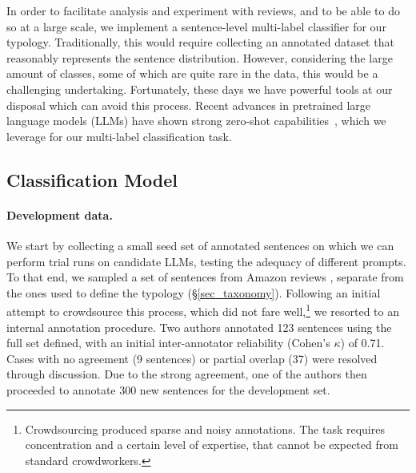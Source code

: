 In order to facilitate analysis and experiment with reviews, and to be able to do so at a large scale, we implement a sentence-level multi-label classifier for our typology.
Traditionally, this would require collecting an annotated dataset that reasonably represents the sentence \taxtype{} distribution.
However, considering the large amount of classes, some of which are quite rare in the data, this would be a challenging undertaking. 
Fortunately, these days we have powerful tools at our disposal which can avoid this process. 
Recent advances in pretrained large language models (LLMs) have shown strong zero-shot capabilities~\citep{wei2022flan}, which we leverage for our multi-label classification task.



\subsection{Classification Model}
\label{sec_prediction_model}

\paragraph{Development data.}
We start by collecting a small seed set of annotated sentences on which we can perform trial runs on candidate LLMs, testing the adequacy of different prompts.
To that end, we sampled a set of sentences from Amazon reviews \citep{he2016reviewsDS}, separate from the ones used to define the typology (\S\ref{sec_taxonomy}). 
Following an initial attempt to crowdsource this process, which did not fare well,\footnote{Crowdsourcing produced sparse and noisy annotations. 
The task requires concentration and a certain level of expertise, that cannot be expected from standard crowdworkers.}
we resorted to an internal annotation procedure.
Two authors annotated 123 sentences using the full \taxtype{} set defined, with an initial inter-annotator reliability (Cohen’s $\kappa$) of 0.71.
Cases with no agreement (9 sentences) or partial \taxtype{} overlap (37) were resolved through discussion. Due to the strong agreement, one of the authors then proceeded to annotate 300 new sentences for the development set.


